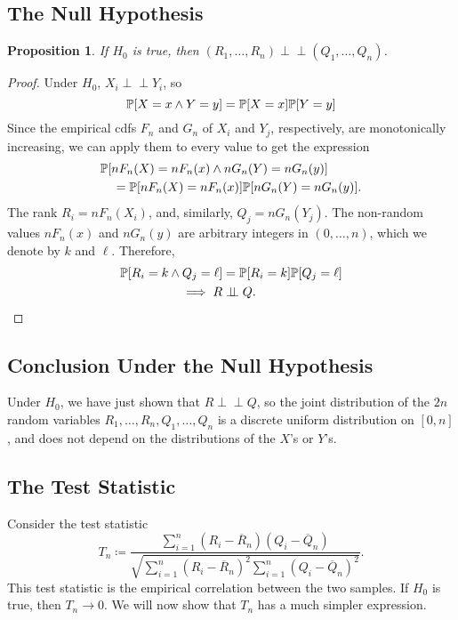 \documentclass[letterpaper, reqno]{amsart}
\newtheorem{prop}{Proposition}[section]
\numberwithin{equation}{section}
\newcommand{\ddfrac}[2]{\frac{\displaystyle #1}{\displaystyle #2}}
\newcommand{\Prob}[1]{\mathbb{P}\mleft[#1\mright]}
\newcommand{\indep}{\perp \!\!\! \perp}  %
\newcommand{\sumi}[2]{\sum_{#1=1}^{#2}}
\newcommand{\Rnbar}{\overline{R}_n}
\newcommand{\Qnbar}{\overline{Q}_n}
\begin{document}
\subsection{The Null Hypothesis} \label{subsec:4}
\begin{prop}
  If $H_0$ is true, then $(R_1, \dots, R_n) \indep (Q_1, \dots, Q_n)$.
\end{prop}

\begin{proof}
  Under $H_0$, $X_i \indep Y_i$, so
  \[ \Prob{X = x \land Y = y} = \Prob{X=x}\Prob{Y=y} \]
  Since the empirical cdfs $F_n$ and $G_n$ of $X_i$ and $Y_j$, respectively, are
  monotonically increasing, we can apply them to every value to get the expression
  \[ \begin{split}
      &\Prob{nF_n(X) = nF_n(x) \land nG_n(Y) = nG_n(y)} \\
      &\quad = \Prob{nF_n(X)=nF_n(x)}\Prob{nG_n(Y)=nG_n(y)}.
      \end{split}
  \]
  The rank $R_i = n F_n(X_i)$, and, similarly, $Q_j = n G_n(Y_j)$. The
  non-random values $nF_n(x)$ and $nG_n(y)$ are arbitrary integers in
  $(0, \dots, n)$, which we denote by $k$ and $\ell$. Therefore,
  \begin{align*}
    \Prob{R_i = k \land Q_j = \ell} &= \Prob{R_i = k}\Prob{Q_j = \ell} \\
    \implies R &\indep Q. \qedhere
  \end{align*}
\end{proof}

\subsection{Conclusion Under the Null Hypothesis} \label{subsec:5}
Under $H_0$, we have just shown that $R \indep Q$, so the joint distribution of
the $2n$ random variables $R_1, \dots, R_n, Q_1, \dots, Q_n$ is a discrete
uniform distribution on $[0, n]$, and does not depend on the distributions of
the $X$'s or $Y$'s.

\subsection{The Test Statistic} \label{subsec:6}
Consider the test statistic
\[ T_n \coloneqq \ddfrac{\sumi{i}{n}(R_i - \Rnbar)(Q_i - \Qnbar)}
                        {\sqrt{\sumi{i}{n} (R_i - \Rnbar)^2 \sumi{i}{n} (Q_i - \Qnbar)^2}}. \]
This test statistic is the empirical correlation between the two samples. If
$H_0$ is true, then $T_n \to 0$. We will now show that $T_n$ has a much simpler
expression.
\end{document}

